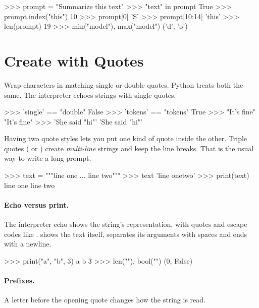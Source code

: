 \begin{pycode}
>>> prompt = "Summarize this text"
>>> "text" in prompt
True
>>> prompt.index("this")
10
>>> prompt[0]
'S'
>>> prompt[10:14]
'this'
>>> len(prompt)
19
>>> min("model"), max("model")
('d', 'o')
\end{pycode}

\section{Create with Quotes}

Wrap characters in matching single or double quotes. Python treats both the same.
The interpreter echoes strings with single quotes.

\begin{pycode}
>>> 'single' == "double"
False
>>> 'tokens' == "tokens"
True
>>> "It's fine"
"It's fine"
>>> 'She said "hi"'
'She said "hi"'
\end{pycode}

Having two quote styles lets you put one kind of quote inside the other. Triple quotes
( or ) create \emph{multi-line} strings and keep the line breaks.
That is the usual way to write a long prompt.

\begin{pycode}
>>> text = """line one
... line two"""
>>> text
'line one\nline two'
>>> print(text)
line one
line two
\end{pycode}

\paragraph{Echo versus print.} The interpreter echo shows the string's representation, with quotes and
escape codes like .  shows the text itself, separates its arguments
with spaces and ends with a newline.

\begin{pycode}
>>> print("a", "b", 3)
a b 3
>>> len(""), bool("")
(0, False)
\end{pycode}

\paragraph{Prefixes.} A letter before the opening quote changes how the string is read.

